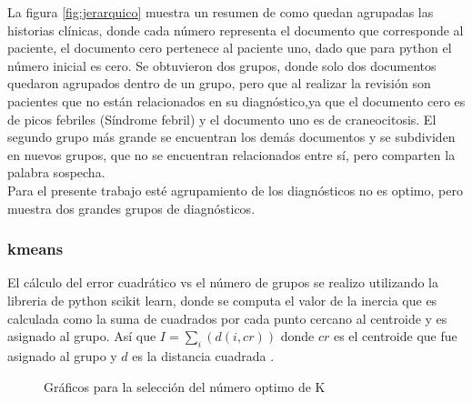 La figura \ref{fig:jerarquico} muestra un resumen de como quedan agrupadas las historias clínicas, donde cada número representa el documento que corresponde al paciente, el documento cero pertenece al paciente uno, dado que para python el número inicial es cero. Se obtuvieron dos grupos, donde solo dos documentos quedaron agrupados dentro de un grupo, pero que al realizar la revisión son pacientes que no están relacionados en su diagnóstico,ya que el documento cero es de picos febriles (Síndrome febril) y el documento uno es de craneocitosis. El segundo grupo más grande se encuentran los demás documentos y se subdividen en nuevos grupos, que no se encuentran relacionados entre sí, pero comparten la palabra sospecha.\\

Para el presente trabajo esté agrupamiento de los diagnósticos no es optimo, pero muestra dos grandes grupos de diagnósticos. 

\subsubsection{kmeans}

El cálculo del error cuadrático vs el número de grupos se realizo utilizando la libreria de python scikit learn, donde se computa el valor de la inercia que es calculada como la suma de cuadrados por cada punto cercano al centroide y es asignado al grupo. Así que  $I = \sum_{i}(d(i,cr))$ donde $cr$ es el centroide que fue asignado al grupo y $d$ es la distancia cuadrada \cite{scikit-learn}. 

\begin{figure}[H]
	\centering
	\caption{Gráficos para la selección del número optimo de K}
	\label{f:medidas}
\end{figure}


